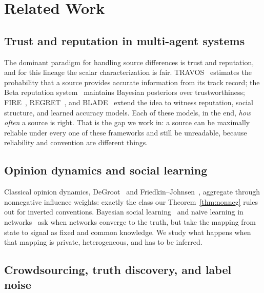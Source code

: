 \section{Related Work}
\label{sec:related}

\subsection{Trust and reputation in multi-agent systems}

The dominant paradigm for handling source differences is trust and
reputation, and for this lineage the scalar characterization is fair.
TRAVOS~\cite{teacy2006} estimates the probability that a source provides
accurate information from its track record; the Beta reputation
system~\cite{josang2001} maintains Bayesian posteriors over
trustworthiness; FIRE~\cite{huynh2006fire}, REGRET~\cite{sabater2002regret},
and BLADE~\cite{regan2006blade} extend the idea to witness reputation,
social structure, and learned accuracy models. Each of these models, in
the end, \emph{how often} a source is right. That is the gap we work in:
a source can be maximally reliable under every one of these frameworks
and still be unreadable, because reliability and convention are different
things.

\subsection{Opinion dynamics and social learning}

{\sloppy
Classical opinion dynamics, DeGroot~\cite{degroot1974} and
Friedkin--Johnsen~\cite{friedkin1999}, aggregate through nonnegative
influence weights: exactly the class our Theorem~\ref{thm:nonneg} rules
out for inverted conventions. Bayesian social learning~\cite{acemoglu2011}
and naive learning in networks~\cite{golub2010} ask when networks
converge to the truth, but take the mapping from state to signal as fixed
and common knowledge. We study what happens when that mapping is private,
heterogeneous, and has to be inferred.
\par}

\subsection{Crowdsourcing, truth discovery, and label noise}

